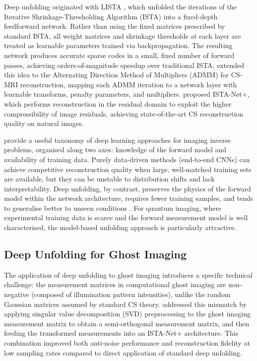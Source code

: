 Deep unfolding originated with LISTA \citep{gregor2010}, which unfolded the iterations of the Iterative Shrinkage-Thresholding Algorithm (ISTA) into a fixed-depth feedforward network. Rather than using the fixed matrices prescribed by standard ISTA, all weight matrices and shrinkage thresholds at each layer are treated as learnable parameters trained via backpropagation. The resulting network produces accurate sparse codes in a small, fixed number of forward passes, achieving orders-of-magnitude speedup over traditional ISTA. \citet{yang2016} extended this idea to the Alternating Direction Method of Multipliers (ADMM) for CS-MRI reconstruction, mapping each ADMM iteration to a network layer with learnable transforms, penalty parameters, and multipliers. \citet{zhang2018ista} proposed ISTA-Net+, which performs reconstruction in the residual domain to exploit the higher compressibility of image residuals, achieving state-of-the-art CS reconstruction quality on natural images.

\citet{ongie2020} provide a useful taxonomy of deep learning approaches for imaging inverse problems, organised along two axes: knowledge of the forward model and availability of training data. Purely data-driven methods (end-to-end CNNs) can achieve competitive reconstruction quality when large, well-matched training sets are available, but they can be unstable to distribution shifts and lack interpretability. Deep unfolding, by contrast, preserves the physics of the forward model within the network architecture, requires fewer training samples, and tends to generalise better to unseen conditions \citep{monga2021}. For quantum imaging, where experimental training data is scarce and the forward measurement model is well characterised, the model-based unfolding approach is particularly attractive.

\subsection{Deep Unfolding for Ghost Imaging}

The application of deep unfolding to ghost imaging introduces a specific technical challenge: the measurement matrices in computational ghost imaging are non-negative (composed of illumination pattern intensities), unlike the random Gaussian matrices assumed by standard CS theory. \citet{cheng2022} addressed this mismatch by applying singular value decomposition (SVD) preprocessing to the ghost imaging measurement matrix to obtain a semi-orthogonal measurement matrix, and then feeding the transformed measurements into an ISTA-Net+ architecture. This combination improved both anti-noise performance and reconstruction fidelity at low sampling rates compared to direct application of standard deep unfolding.


